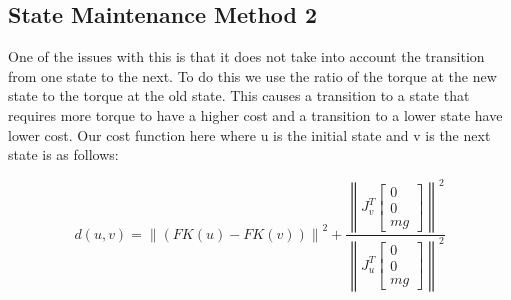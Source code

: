 \documentclass{article}
\newcommand{\bM}{\begin{bmatrix}}
\newcommand{\eM}{\end{bmatrix}}
\begin{document}
\subsection{State Maintenance Method 2}

	One of the issues with this is that it does not take into account the transition from one state to the next.  To do this we use the ratio of the torque at the new state to the torque at the old state.  This causes a transition to a state that requires more torque to have a higher cost and a transition to a lower state have lower cost.  Our cost function here where u is the initial state and v is the next state is as follows:
	
	 \[	d(u,v) =  \left\|(FK(u)-FK(v))\right\|^2 + \frac{\left\|J^T_v\bM 0 \\ 0 \\ mg \eM\right\|^2}{\left\|J^T_u\bM 0 \\ 0 \\ mg \eM\right\|^2}\]
	 
\end{document}
